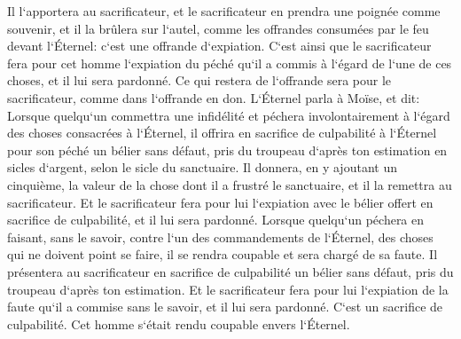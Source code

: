 \verse Il l`apportera au sacrificateur, et le sacrificateur en prendra une poignée comme souvenir, et il la brûlera sur l`autel, comme les offrandes consumées par le feu devant l`Éternel: c`est une offrande d`expiation. 
\verse C`est ainsi que le sacrificateur fera pour cet homme l`expiation du péché qu`il a commis à l`égard de l`une de ces choses, et il lui sera pardonné. Ce qui restera de l`offrande sera pour le sacrificateur, comme dans l`offrande en don. 
\verse L`Éternel parla à Moïse, et dit: 
\verse Lorsque quelqu`un commettra une infidélité et péchera involontairement à l`égard des choses consacrées à l`Éternel, il offrira en sacrifice de culpabilité à l`Éternel pour son péché un bélier sans défaut, pris du troupeau d`après ton estimation en sicles d`argent, selon le sicle du sanctuaire. 
\verse Il donnera, en y ajoutant un cinquième, la valeur de la chose dont il a frustré le sanctuaire, et il la remettra au sacrificateur. Et le sacrificateur fera pour lui l`expiation avec le bélier offert en sacrifice de culpabilité, et il lui sera pardonné. 
\verse Lorsque quelqu`un péchera en faisant, sans le savoir, contre l`un des commandements de l`Éternel, des choses qui ne doivent point se faire, il se rendra coupable et sera chargé de sa faute. 
\verse Il présentera au sacrificateur en sacrifice de culpabilité un bélier sans défaut, pris du troupeau d`après ton estimation. Et le sacrificateur fera pour lui l`expiation de la faute qu`il a commise sans le savoir, et il lui sera pardonné. 
\verse C`est un sacrifice de culpabilité. Cet homme s`était rendu coupable envers l`Éternel. 

